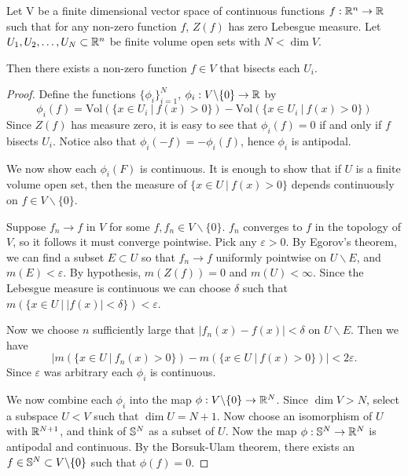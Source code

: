 \begin{theorem}
Let V be a finite dimensional vector space of continuous functions $f:\mathbb R^n \to \mathbb R$ such that for any non-zero function $f$,
 $Z(f)$ has zero Lebesgue measure. 
Let $U_1,U_2,\dots,U_N \subset \mathbb R^n$ be finite volume open sets with $N< \dim V$. 

Then there exists a non-zero function $f \in V$ that bisects each $U_i$. \label{thm:GenHamSand}
\end{theorem}
\begin{proof}
Define the functions $\{\phi_i\}_{i=1}^N$, $\phi_i: V\backslash \{0\} \to \mathbb R$ by
\[
\phi_i(f) = \text{Vol}(\{x\in U_i \ | \ f(x) > 0 \}) - \text{Vol}(\{x\in U_i \ |\ f(x) > 0 \})
\]
Since $Z(f)$ has measure zero, it is easy to see that $\phi_i(f) = 0$ if and only if $f$ bisects $U_i$. 
Notice also that $\phi_i(-f) = -\phi_i(f)$, hence $\phi_i$ is antipodal. 

We now show each $\phi_i(F)$ is continuous.
It is enough to show that if $U$ is a finite volume open set, then the measure of $\{x\in U\ |\ f(x)>0\}$ depends continuously on $f\in V \backslash \{0\}$.

Suppose $f_n \to f$ in $V$ for some $f,f_n \in V \backslash \{0\}$. $f_n$ converges to $f$ in the topology of $V$, 
so it follows it must converge pointwise. Pick any $\varepsilon >0$. 
By Egorov's theorem, we can find a subset $E\subset U$ so that $f_n \to f$ uniformly pointwise on $U \backslash E$, and $m(E)< \varepsilon$.
By hypothesis, $m(Z(f)) =0$ and $m(U) < \infty$. 
Since the Lebesgue measure is continuous we can choose $\delta$ such that $m\left(\{x\in U\ |\ |f(x)|<\delta\}\right) < \varepsilon$.

Now we choose $n$ sufficiently large that $|f_n (x) - f(x)| < \delta$ on $U\backslash E$. Then we have \[|m\left(\{x\in U\ |\ f_n(x)>0\}\right) - m\left(\{x\in U\ |\ f(x)>0\}\right)| < 2 \varepsilon.\] Since $\varepsilon$ was arbitrary each $\phi_i$ is continuous.


We now combine each $\phi_i$ into the map $\phi : V\backslash \{0\} \to \mathbb R^N$. Since $\dim V > N$, select a subspace $U < V$ such that $\dim U = N+1$. 
Now choose an isomorphism of $U$ with $\mathbb R^{N+1}$, and think of $\mathbb S^N$ as a subset of $U$.
Now the map $\phi: \mathbb S^N \to \mathbb R^N$ is antipodal and continuous. 
By the Borsuk-Ulam theorem, there exists an $f\in \mathbb S^N \subset V\backslash \{0\}$ such that $\phi(f) = 0$.
\end{proof}


